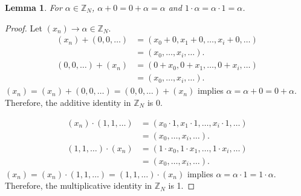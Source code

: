 \documentclass[english]{article}
\def\zzzn{\mathbb{Z}_N}
\def\xn{(x_n)}
\theoremstyle{plain}
\newtheorem{lemma}[theorem]{Lemma}%
\theoremstyle{definition}
\theoremstyle{remark}
\begin{document}
\begin{lemma}\label{lem:identity}
  For $\alpha \in \zzzn$, $\alpha+0=0+\alpha=\alpha$ and $1\cdot\alpha=\alpha\cdot1=\alpha$.
\end{lemma}
\begin{proof}
  Let $\xn\rightarrow\alpha\in\zzzn$.
  \begin{align*}
    \xn+(0,0,\dots)&=(x_0+0,x_1+0,\dots,x_i+0,\dots)\\
                     &=(x_0,\dots,x_i,\dots).\\
    (0,0,\dots)+\xn&=(0+x_0,0+x_1,\dots,0+x_i,\dots)\\
                     &=(x_0,\dots,x_i,\dots).
  \end{align*}
  $\xn=\xn+(0,0,\dots)=(0,0,\dots)+\xn$ implies $\alpha=\alpha+0=0+\alpha$.
  Therefore, the additive identity in $\zzzn$ is 0.

  \begin{align*}
    \xn\cdot(1,1,\dots)&=(x_0\cdot 1,x_1\cdot 1,\dots,x_i\cdot 1,\dots)\\
                         &=(x_0,\dots,x_i,\dots).\\
    (1,1,\dots)\cdot\xn&=(1\cdot x_0,1\cdot x_1,\dots,1\cdot x_i,\dots)\\
                         &=(x_0,\dots,x_i,\dots).
  \end{align*}
   $\xn=\xn\cdot(1,1,\dots)=(1,1,\dots)\cdot\xn$ implies $\alpha=\alpha\cdot1=1\cdot\alpha$.
  Therefore, the multiplicative identity in $\zzzn$ is 1.
\end{proof}   
\end{document}
